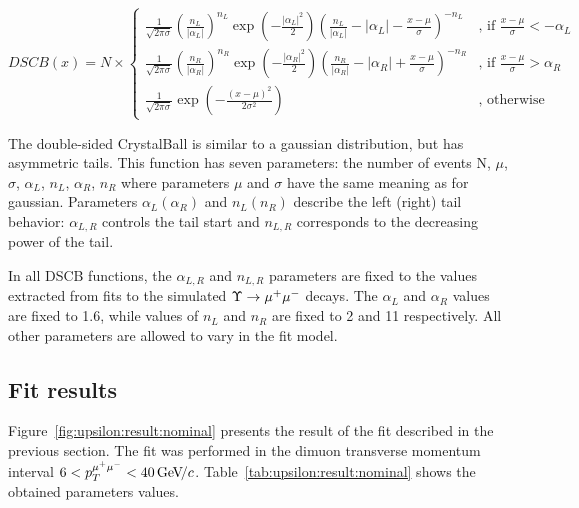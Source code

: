\begin{equation}
DSCB(x) = N \times
\begin{cases}
\frac{1}{\sqrt{2\pi\sigma}}{(\frac{n_L}{|\alpha_L|})}^{n_L}\exp(-\frac{|\alpha_L|^2}{2}){(\frac{n_L}{|\alpha_L|}-|\alpha_L|-\frac{x-\mu}{\sigma})}^{-n_L} & \text{, if $\frac{x-\mu}{\sigma} < -\alpha_L$}\\
\frac{1}{\sqrt{2\pi\sigma}}{(\frac{n_R}{|\alpha_R|})}^{n_R}\exp(-\frac{|\alpha_R|^2}{2}){(\frac{n_R}{|\alpha_R|}-|\alpha_R|+\frac{x-\mu}{\sigma})}^{-n_R} & \text{, if $\frac{x-\mu}{\sigma} > \alpha_R$}\\
\frac{1}{\sqrt{2\pi\sigma}}\exp(-\frac{{(x-\mu)}^2}{2\sigma^2}) & \text{, otherwise}
\end{cases}
\label{eq:dcb}
\end{equation}

The double-sided CrystalBall is similar to a gaussian
distribution, but has asymmetric tails. This function has seven parameters:
the number of events N, $\mu$, $\sigma$, $\alpha_L$, $n_L$, $\alpha_R$, $n_R$ where parameters $\mu$
and $\sigma$ have the same meaning as for gaussian. Parameters $\alpha_L
(\alpha_R)$ and $n_L (n_R)$ describe the left (right) tail behavior:
$\alpha_{L,R}$ controls the tail start and $n_{L,R}$ corresponds to the
decreasing power of the tail. 

In all DSCB functions, the  $\alpha_{L,R}$ and $n_{L,R}$ parameters are fixed to the values extracted
from fits to the simulated $\Upsilon \rightarrow {\ensuremath{\mu^+\mu^-}}$ decays. The $\alpha_L$ and
$\alpha_R$ values are fixed to 1.6, while values of $n_L$  and $n_R$ are fixed
to 2 and 11 respectively. All other parameters are allowed to vary in the fit model.

\subsection{Fit results}
\label{sec:upsilon:result}

Figure~\ref{fig:upsilon:result:nominal} presents the result of the fit 
described in the previous section. The fit was performed in the dimuon
transverse momentum interval $ 6 < p_T^{{\mu^+\mu^-}} < 40 {\mathrm{\,Ge\kern -0.1em V\!/}c}$.
Table~\ref{tab:upsilon:result:nominal} shows the obtained parameters values. 






